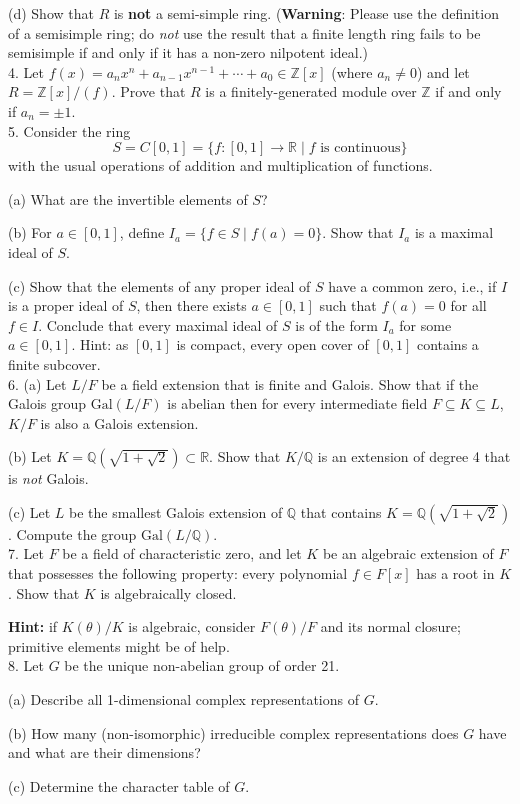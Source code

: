 \documentclass[11pt]{article}
\newcommand{\Z}{\mathbb{Z}}
\newcommand{\Q}{\mathbb{Q}}
\newcommand{\R}{\mathbb{R}}
\begin{document}
(d) Show that $R$ is \textbf{not} a semi-simple ring. (\textbf{Warning}: Please use the definition
of a semisimple ring; do \emph{not} use the result that a finite length ring fails to be
semisimple if and only if it has a non-zero nilpotent ideal.)\\

4. Let $f(x) = a_nx^n + a_{n-1}x^{n-1}+\cdots+a_0\in \Z[x]$ (where $a_n\neq 0$) and let $R = \Z[x]/(f)$. Prove that $R$ is a finitely-generated module over $\Z$ if and only if $a_n = \pm 1$. \\

5. Consider the ring \[
S = C[0,1] = \{f:[0,1]\to \R \mid \text{$f$ is continuous}\}
\]
with the usual operations of addition and multiplication of functions.

(a) What are the invertible elements of $S$?

(b) For $a\in [0,1]$, define $I_a = \{f\in S\mid f(a) = 0\}$. Show that $I_a$ is a maximal ideal of $S$. 

(c) Show that the elements of any proper ideal of $S$ have a common zero, i.e., if $I$ is
a proper ideal of $S$, then there exists $a\in [0, 1]$ such that $f(a) = 0$ for all $f \in I$.
Conclude that every maximal ideal of $S$ is of the form $I_a$ for some $a \in[0, 1]$.
Hint: as $[0, 1]$ is compact, every open cover of $[0, 1]$ contains a finite subcover.\\

6. (a) Let $L/F$ be a field extension that is finite and Galois. Show that if the Galois
group $\mbox{Gal}(L/F)$ is abelian then for every intermediate field $F\subseteq  K \subseteq L$, $K/F$ is
also a Galois extension.

(b) Let $K = \Q(\sqrt{1+\sqrt{2}}) \subset \R$. Show that $K/\Q$ is an extension of degree 4 that is \emph{not} Galois.

(c) Let $L$ be the smallest Galois extension of $\Q$ that contains $K = \Q(\sqrt{1+\sqrt{2}})$. Compute the group $\mbox{Gal}(L/\Q)$. \\

7. Let $F$ be a field of characteristic zero, and let $K$ be an algebraic extension of $F$ that
possesses the following property: every polynomial $f \in F[x]$ has a root in $K$. Show
that $K$ is algebraically closed.

\textbf{Hint:} if $K(\theta)/K$ is algebraic, consider $F(\theta)/F$ and its normal closure; primitive elements
might be of help.\\

8. Let $G$ be the unique non-abelian group of order 21.

(a) Describe all 1-dimensional complex representations of $G$.

(b) How many (non-isomorphic) irreducible complex representations does $G$ have and
what are their dimensions?

(c) Determine the character table of $G$.
\end{document}
